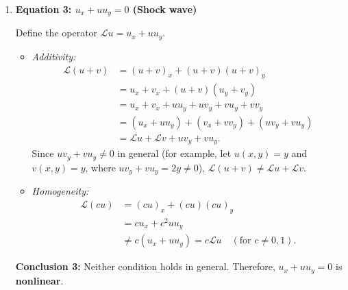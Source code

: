 \documentclass[11pt,a4paper]{article}
\begin{document}
\begin{enumerate}[label=\textbf{\arabic*.}]
    Define the operator $\mathcal{L}u = u_x + y u_y$.
    \begin{itemize}
        \item \emph{Additivity:}
        \begin{align*}
            \mathcal{L}(u + v) &= (u + v)_x + y(u + v)_y \\
            &= u_x + v_x + y(u_y + v_y) \\
            &= u_x + v_x + y u_y + y v_y \\
            &= (u_x + y u_y) + (v_x + y v_y) \\
            &= \mathcal{L}u + \mathcal{L}v.
        \end{align*}
        \item \emph{Homogeneity:}
        \begin{align*}
            \mathcal{L}(cu) &= (cu)_x + y(cu)_y \\
            &= cu_x + y(cu_y) \\
            &= c(u_x + y u_y) \\
            &= c\mathcal{L}u.
        \end{align*}
    \end{itemize}
    \textbf{Conclusion 2:} Both conditions hold for all $u, v, c$. Therefore, $u_x + y u_y = 0$ is \textbf{linear}.

    \item \textbf{Equation 3: $u_x + u u_y = 0$ (Shock wave)}
    
    Define the operator $\mathcal{L}u = u_x + u u_y$.
    \begin{itemize}
        \item \emph{Additivity:}
        \begin{align*}
            \mathcal{L}(u + v) &= (u + v)_x + (u + v)(u + v)_y \\
            &= u_x + v_x + (u + v)(u_y + v_y) \\
            &= u_x + v_x + u u_y + u v_y + v u_y + v v_y \\
            &= (u_x + u u_y) + (v_x + v v_y) + (u v_y + v u_y) \\
            &= \mathcal{L}u + \mathcal{L}v + u v_y + v u_y.
        \end{align*}
        Since $u v_y + v u_y \neq 0$ in general (for example, let $u(x,y) = y$ and $v(x,y) = y$, where $u v_y + v u_y = 2y \neq 0$), $\mathcal{L}(u + v) \neq \mathcal{L}u + \mathcal{L}v$.
        \item \emph{Homogeneity:}
        \begin{align*}
            \mathcal{L}(cu) &= (cu)_x + (cu)(cu)_y \\
            &= c u_x + c^2 u u_y \\
            &\neq c(u_x + u u_y) = c\mathcal{L}u \quad (\text{for } c \neq 0, 1).
        \end{align*}
    \end{itemize}
    \textbf{Conclusion 3:} Neither condition holds in general. Therefore, $u_x + u u_y = 0$ is \textbf{nonlinear}.


\end{enumerate}
\end{document}

